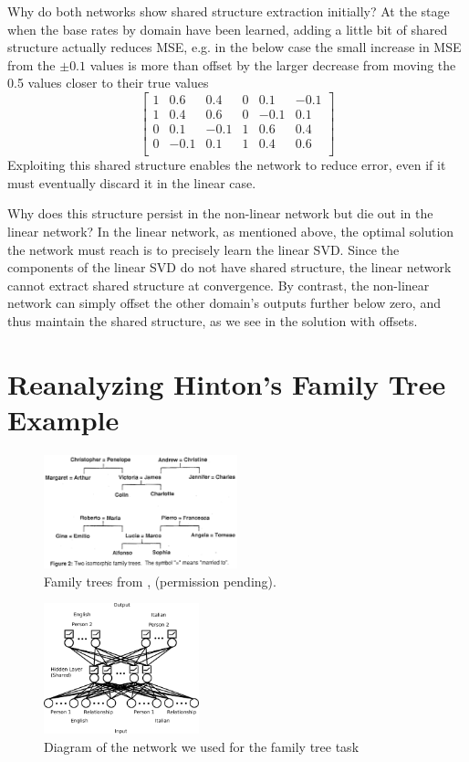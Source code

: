 \documentclass[10pt,letterpaper]{article}
\begin{document}
Why do both networks show shared structure extraction initially? At the stage when the base rates by domain have been learned, adding a little bit of shared structure actually reduces MSE, e.g. in the below case the small increase in MSE from the \(\pm 0.1\) values is more than offset by the larger decrease from moving the 0.5 values closer to their true values 
\[ 
\left[ \begin{matrix} 
1 & 0.6 & 0.4 & 0 & 0.1 & -0.1 \\
1 & 0.4 & 0.6 & 0 & -0.1 & 0.1 \\
0 & 0.1 & -0.1 & 1 & 0.6 & 0.4  \\
0 & -0.1 & 0.1 & 1 & 0.4 & 0.6  \\
\end{matrix}  \right] 
\] 
Exploiting this shared structure enables the network to reduce error, even if it must eventually discard it in the linear case.  \par
Why does this structure persist in the non-linear network but die out in the linear network? In the linear network, as mentioned above, the optimal solution the network must reach is to precisely learn the linear SVD. Since the components of the linear SVD do not have shared structure, the linear network cannot extract shared structure at convergence. By contrast, the non-linear network can simply offset the other domain's outputs further below zero, and thus maintain the shared structure, as we see in the solution with offsets. 
\section{Reanalyzing Hinton's Family Tree Example}
\begin{figure}
\includegraphics[width=0.5\textwidth]{figures/hinton_family_tree_figure.png}
\caption{Family trees from \citet{Hinton1986}, (permission pending).}
\label{hinton_family_tree_figure}
\end{figure}

\begin{figure}
\centering
\includegraphics[width=0.4\textwidth]{figures/family_tree_network_diagram.png}
\caption{Diagram of the network we used for the family tree task}
\label{family_tree_network_diagram}
\end{figure}
\end{document}
